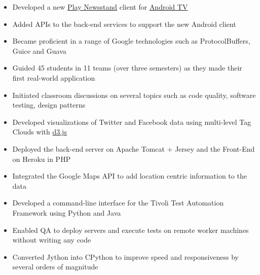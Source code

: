 \documentclass[11pt,a4paper]{moderncv}
\begin{document}
{\begin{itemize}
        \item Developed a new \href{https://play.google.com/store/apps/details?id=com.google.android.apps.magazines&hl=en}{Play Newsstand} client for \href{http://www.android.com/tv/}{Android TV}
        \item Added APIs to the back-end services to support the new Android client
        \item Became proficient in a range of Google technologies such as ProtocolBuffers, Guice and Guava
 \end{itemize}}
{\begin{itemize}
        \item Guided 45 students in 11 teams (over three semesters) as they made their first real-world application
        \item Initiated classroom discussions on several topics such as code quality, software testing, design patterns
 \end{itemize}}

{\begin{itemize}
        \item Developed visualizations of Twitter and Facebook data using multi-level Tag Clouds with \href{http://d3js.org/}{d3.js}
        \item Deployed the back-end server on Apache Tomcat + Jersey and the Front-End on Heroku in PHP
        \item Integrated the Google Maps API to add location centric information to the data
 \end{itemize}}

{\begin{itemize}
        \item Developed a command-line interface for the Tivoli Test Automation Framework using Python and Java
        \item Enabled QA to deploy servers and execute tests on remote worker machines without writing any code
        \item Converted Jython into CPython to improve speed and responsiveness by several orders of magnitude
 \end{itemize}}
\end{document}
